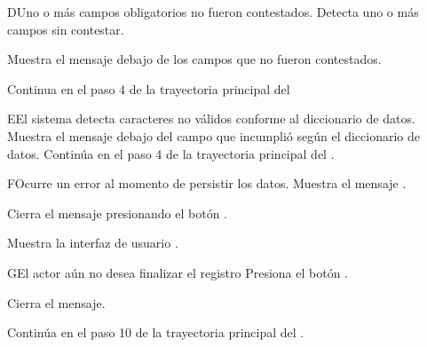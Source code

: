 \begin{UCtrayectoriaA}{D}{Uno o más campos obligatorios no fueron contestados.}
\UCpaso Detecta uno o más campos sin contestar.

\UCpaso Muestra el mensaje  debajo de los campos que no fueron contestados.

\UCpaso Continua en el paso 4 de la trayectoria principal del 
\end{UCtrayectoriaA}

\begin{UCtrayectoriaA}{E}{El sistema detecta caracteres no válidos conforme al diccionario de datos.}
	\UCpaso Muestra el mensaje  debajo del campo que incumplió según el diccionario de datos.
	\UCpaso Continúa en el paso 4 de la trayectoria principal del .
\end{UCtrayectoriaA}

\begin{UCtrayectoriaA}{F}{Ocurre un error al momento de persistir los datos.}
	\UCpaso Muestra el mensaje .
	
	\UCpaso[\UCactor] Cierra el mensaje presionando el botón .
	
	\UCpaso Muestra la interfaz de usuario .
\end{UCtrayectoriaA}

\begin{UCtrayectoriaA}{G}{El actor aún no desea finalizar el registro}
	\UCpaso[\UCactor] Presiona el botón .
	
	\UCpaso Cierra el mensaje.
	
	\UCpaso Continúa en el paso 10 de la trayectoria principal del .
\end{UCtrayectoriaA}